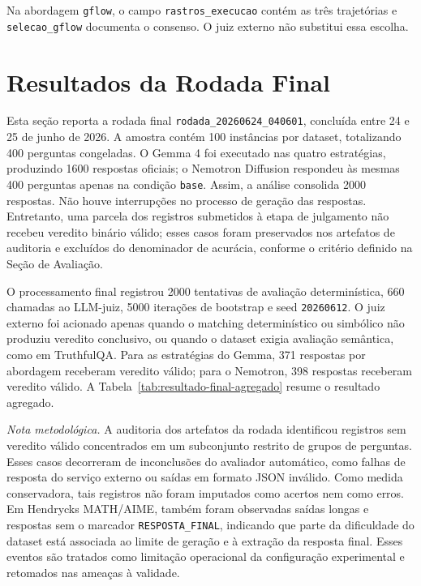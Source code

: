 \documentclass[12pt]{article}
\begin{document}
Na abordagem \texttt{gflow}, o campo \texttt{rastros\_execucao} contém as três trajetórias e \texttt{selecao\_gflow} documenta o consenso. O juiz externo não substitui essa escolha.

\section{Resultados da Rodada Final}

Esta seção reporta a rodada final \texttt{rodada\_20260624\_040601}, concluída entre 24 e 25 de junho de 2026. A amostra contém 100 instâncias por dataset, totalizando 400 perguntas congeladas. O Gemma 4 foi executado nas quatro estratégias, produzindo 1600 respostas oficiais; o Nemotron Diffusion respondeu às mesmas 400 perguntas apenas na condição \texttt{base}. Assim, a análise consolida 2000 respostas. Não houve interrupções no processo de geração das respostas. Entretanto, uma parcela dos registros submetidos à etapa de julgamento não recebeu veredito binário válido; esses casos foram preservados nos artefatos de auditoria e excluídos do denominador de acurácia, conforme o critério definido na Seção de Avaliação.

O processamento final registrou 2000 tentativas de avaliação determinística, 660 chamadas ao LLM-juiz, 5000 iterações de bootstrap e seed \texttt{20260612}. O juiz externo foi acionado apenas quando o matching determinístico ou simbólico não produziu veredito conclusivo, ou quando o dataset exigia avaliação semântica, como em TruthfulQA. Para as estratégias do Gemma, 371 respostas por abordagem receberam veredito válido; para o Nemotron, 398 respostas receberam veredito válido. A Tabela~\ref{tab:resultado-final-agregado} resume o resultado agregado.

\noindent\textit{Nota metodológica.} A auditoria dos artefatos da rodada identificou registros sem veredito válido concentrados em um subconjunto restrito de grupos de perguntas. Esses casos decorreram de inconclusões do avaliador automático, como falhas de resposta do serviço externo ou saídas em formato JSON inválido. Como medida conservadora, tais registros não foram imputados como acertos nem como erros. Em Hendrycks MATH/AIME, também foram observadas saídas longas e respostas sem o marcador \texttt{RESPOSTA\_FINAL}, indicando que parte da dificuldade do dataset está associada ao limite de geração e à extração da resposta final. Esses eventos são tratados como limitação operacional da configuração experimental e retomados nas ameaças à validade.
\end{document}
